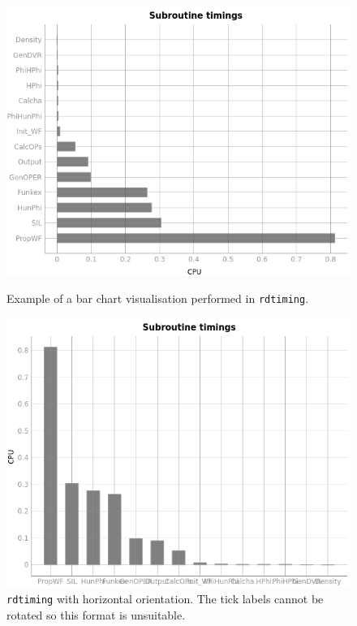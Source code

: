 \documentclass[12pt]{article}
\begin{document}
\begin{figure}[h]
    \centering
    \begin{minipage}[t]{.47\textwidth}
        \centering
        \includegraphics[width=\textwidth]{img/timing_bar.png}
        \caption{Example of a bar chart visualisation performed in \texttt{rdtiming}.}
        \label{fig:timing_bar}
    \end{minipage}\hfill\begin{minipage}[t]{.47\textwidth}
        \centering
        \includegraphics[width=\textwidth]{img/timing_bar_wrong.png}
        \caption{\texttt{rdtiming} with horizontal orientation. The tick labels cannot be rotated so this format is unsuitable.}
        \label{fig:timing_bar_wrong}
    \end{minipage}
\end{figure}
\end{document}
